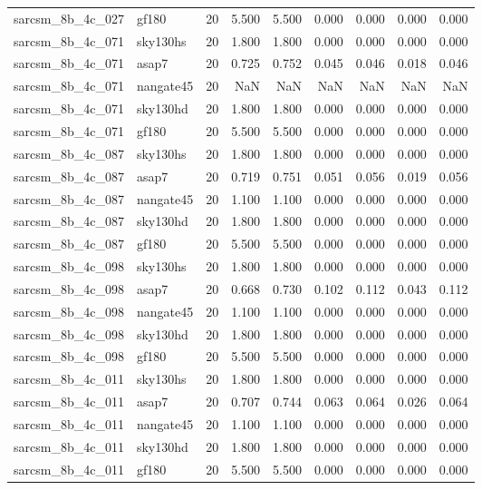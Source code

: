\begin{tabular}{llrrrrrrr}
sarcsm\_8b\_4c\_027 & gf180 & 20 & 5.500 & 5.500 & 0.000 & 0.000 & 0.000 & 0.000 \\
sarcsm\_8b\_4c\_071 & sky130hs & 20 & 1.800 & 1.800 & 0.000 & 0.000 & 0.000 & 0.000 \\
sarcsm\_8b\_4c\_071 & asap7 & 20 & 0.725 & 0.752 & 0.045 & 0.046 & 0.018 & 0.046 \\
sarcsm\_8b\_4c\_071 & nangate45 & 20 & NaN & NaN & NaN & NaN & NaN & NaN \\
sarcsm\_8b\_4c\_071 & sky130hd & 20 & 1.800 & 1.800 & 0.000 & 0.000 & 0.000 & 0.000 \\
sarcsm\_8b\_4c\_071 & gf180 & 20 & 5.500 & 5.500 & 0.000 & 0.000 & 0.000 & 0.000 \\
sarcsm\_8b\_4c\_087 & sky130hs & 20 & 1.800 & 1.800 & 0.000 & 0.000 & 0.000 & 0.000 \\
sarcsm\_8b\_4c\_087 & asap7 & 20 & 0.719 & 0.751 & 0.051 & 0.056 & 0.019 & 0.056 \\
sarcsm\_8b\_4c\_087 & nangate45 & 20 & 1.100 & 1.100 & 0.000 & 0.000 & 0.000 & 0.000 \\
sarcsm\_8b\_4c\_087 & sky130hd & 20 & 1.800 & 1.800 & 0.000 & 0.000 & 0.000 & 0.000 \\
sarcsm\_8b\_4c\_087 & gf180 & 20 & 5.500 & 5.500 & 0.000 & 0.000 & 0.000 & 0.000 \\
sarcsm\_8b\_4c\_098 & sky130hs & 20 & 1.800 & 1.800 & 0.000 & 0.000 & 0.000 & 0.000 \\
sarcsm\_8b\_4c\_098 & asap7 & 20 & 0.668 & 0.730 & 0.102 & 0.112 & 0.043 & 0.112 \\
sarcsm\_8b\_4c\_098 & nangate45 & 20 & 1.100 & 1.100 & 0.000 & 0.000 & 0.000 & 0.000 \\
sarcsm\_8b\_4c\_098 & sky130hd & 20 & 1.800 & 1.800 & 0.000 & 0.000 & 0.000 & 0.000 \\
sarcsm\_8b\_4c\_098 & gf180 & 20 & 5.500 & 5.500 & 0.000 & 0.000 & 0.000 & 0.000 \\
sarcsm\_8b\_4c\_011 & sky130hs & 20 & 1.800 & 1.800 & 0.000 & 0.000 & 0.000 & 0.000 \\
sarcsm\_8b\_4c\_011 & asap7 & 20 & 0.707 & 0.744 & 0.063 & 0.064 & 0.026 & 0.064 \\
sarcsm\_8b\_4c\_011 & nangate45 & 20 & 1.100 & 1.100 & 0.000 & 0.000 & 0.000 & 0.000 \\
sarcsm\_8b\_4c\_011 & sky130hd & 20 & 1.800 & 1.800 & 0.000 & 0.000 & 0.000 & 0.000 \\
sarcsm\_8b\_4c\_011 & gf180 & 20 & 5.500 & 5.500 & 0.000 & 0.000 & 0.000 & 0.000 \\

\end{tabular}
